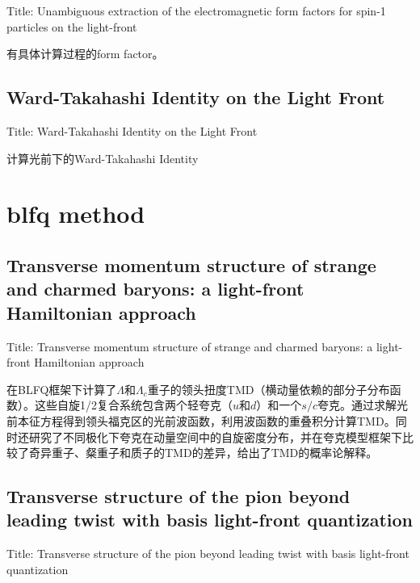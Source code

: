 \documentclass{article}
\begin{document}
Title: \quad Unambiguous extraction of the electromagnetic form factors for spin-1
particles on the light-front \cite{de_Melo_2019} 

有具体计算过程的form factor。 

\subsection{Ward-Takahashi Identity on the Light Front} 

Title: \quad  Ward-Takahashi Identity on the Light Front \cite{Naus_1998} 

计算光前下的Ward-Takahashi Identity




















\section{blfq method}

\subsection{Transverse momentum structure of strange and charmed baryons: a light-front Hamiltonian approach}

Title: \quad Transverse momentum structure of strange and charmed baryons: a light-front Hamiltonian approach \cite{zhu2023tmd}

在BLFQ框架下计算了$\Lambda$和$\Lambda_c$重子的领头扭度TMD（横动量依赖的部分子分布函数）。这些自旋1/2复合系统包含两个轻夸克（$u$和$d$）和一个$s/c$夸克。通过求解光前本征方程得到领头福克区的光前波函数，利用波函数的重叠积分计算TMD。同时还研究了不同极化下夸克在动量空间中的自旋密度分布，并在夸克模型框架下比较了奇异重子、粲重子和质子的TMD的差异，给出了TMD的概率论解释。


\subsection{Transverse structure of the pion beyond leading twist with basis light-front quantization}

Title: \quad Transverse structure of the pion beyond leading twist with basis light-front quantization \cite{zhu2023pion}
\end{document}
